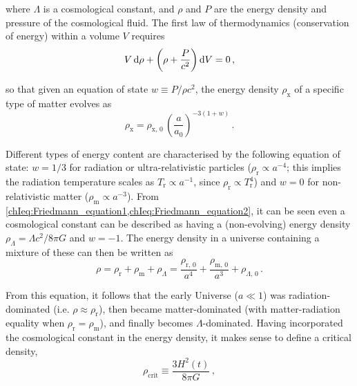 \noindent where $\Lambda$ is a cosmological constant, and $\rho$ and $P$ are the energy density and pressure of the cosmological fluid. The first law of thermodynamics (conservation of energy) within a volume $V$ requires
\begin{equation}
    \label{chIeq:First_law_thermodynamics}
    V \dif \rho + \left( \rho + \frac{P}{c^2} \right) \dif V = 0 \, ,
\end{equation}

\noindent so that given an equation of state $w \equiv P/\rho c^2$, the energy density $\rho_\text{x}$ of a specific type of matter evolves as
\begin{equation}
    \label{chIeq:Energy_density_scaling}
    \rho_\text{x} = \rho_{\text{x}, \, 0} \, \left( \frac{a}{a_0} \right)^{-3(1+w)} \, .
\end{equation}

Different types of energy content are characterised by the following equation of state: $w = 1/3$ for radiation or ultra-relativistic particles ($\rho_\text{r} \propto a^{-4}$; this implies the radiation temperature scales as $T_\text{r} \propto a^{-1}$, since $\rho_\text{r} \propto T_\text{r}^4$) and $w = 0$ for non-relativistic matter ($\rho_\text{m} \propto a^{-3}$). From \cref{chIeq:Friedmann_equation1,chIeq:Friedmann_equation2}, it can be seen even a cosmological constant can be described as having a (non-evolving) energy density $\rho_\Lambda =\Lambda c^2/8 \pi G$ and $w = -1$. The energy density in a universe containing a mixture of these can then be written as
\begin{equation}
    \label{chIeq:Total_energy_density}
    \rho = \rho_\text{r} + \rho_\text{m} + \rho_\Lambda = \frac{\rho_{\text{r}, \, 0}}{a^4} + \frac{\rho_{\text{m}, \, 0}}{a^3} + \rho_{\Lambda, \, 0} \, .
\end{equation}

From this equation, it follows that the early Universe ($a \ll 1$) was radiation-dominated (i.e. $\rho \approx \rho_\text{r}$), then became matter-dominated (with matter-radiation equality when $\rho_\text{r} = \rho_\text{m}$), and finally becomes $\Lambda$-dominated. Having incorporated the cosmological constant in the energy density, it makes sense to define a critical density,
\begin{equation}
    \label{chIeq:Critical_density}
    \rho_\text{crit} \equiv \frac{3 H^2(t)}{8 \pi G} \, ,
\end{equation}

